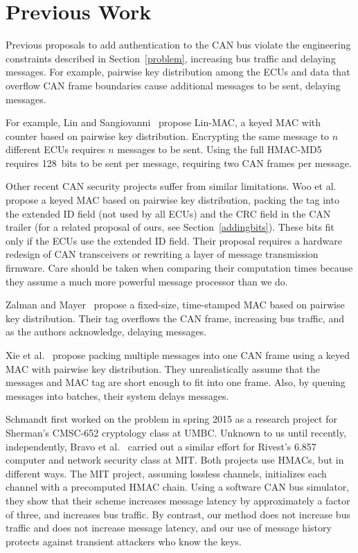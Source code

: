 \section{Previous Work}
\label{previous}

Previous proposals to add authentication to the CAN bus violate the engineering constraints described
in Section~\ref{problem}, increasing bus traffic and delaying messages.  For example, pairwise
key distribution among the ECUs and data that overflow CAN frame boundaries cause additional messages to be sent,
delaying messages.

For example, Lin and Sangiovanni~\cite{Lin-MAC} propose Lin-MAC, a keyed MAC with counter based on
pairwise key distribution.  Encrypting the same message to $n$ different ECUs requires $n$
messages to be sent.   Using the full HMAC-MD5 requires 128~bits to be sent per message, requiring two CAN frames per message.

Other recent CAN security projects suffer from similar limitations. 
Woo et al.~\cite{Woo-14} propose a keyed MAC based on pairwise key distribution,
packing the tag into the extended ID field (not used by all ECUs) and the CRC field in the CAN trailer
(for a related proposal of ours, see Section~\ref{addingbits}). 
These bits fit only if the ECUs use the extended ID field. 
Their proposal requires a hardware redesign of CAN transceivers or rewriting a layer of message transmission firmware.
Care should be taken when comparing their computation times because
they assume a much more powerful message processor than we do. 

Zalman and Mayer~\cite{Zalman-14} propose a fixed-size, time-stamped MAC based on pairwise key distribution.
Their tag overflows the CAN frame, increasing bus traffic, and as the authors acknowledge,
delaying messages.

Xie et al.~\cite{Xie-15} propose packing multiple messages into one CAN frame using a keyed MAC with 
pairwise key distribution.   They unrealistically assume that the messages and MAC tag are short
enough to fit into one frame.  Also, by queuing messages into batches, their system delays messages.


Schmandt first worked on the problem in spring 2015
as a research project for Sherman's CMSC-652 cryptology class at UMBC.
Unknown to us until recently, independently, Bravo et al.~\cite{MIT2015} carried out a similar effort 
for Rivest's 6.857 computer and network security class at MIT.  Both projects use HMACs, but in different ways.
The MIT project, assuming lossless channels, initializes each channel with a precomputed HMAC chain.
Using a software CAN bus simulator, they show that their scheme increases message latency by
approximately a factor of three, and increases bus traffic.  By contrast, our method does not increase
bus traffic and does not increase message latency, and our use of message history protects against transient
attackers who know the keys.

